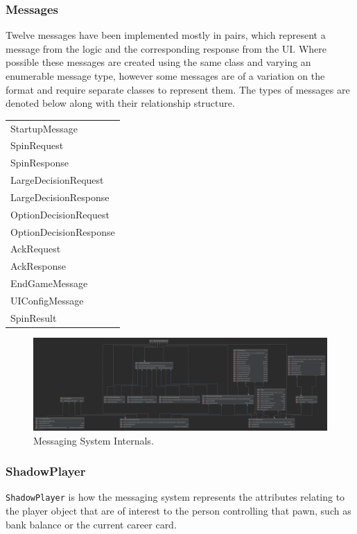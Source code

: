 \documentclass[a4paper, 11pt]{article}
\begin{document}
	\subsubsection*{Messages}
	Twelve messages have been implemented mostly in pairs, which represent a message from the logic and the corresponding response from the UI. Where possible these messages are created using the same class and varying an enumerable message type, however some messages are of a variation on the format and require separate classes to represent them. The types of messages are denoted below along with their relationship structure.
	\begin{table}[!ht]
		\begin{flushleft} 
			\begin{tabular}{l} 
				StartupMessage\\
				SpinRequest\\
				SpinResponse\\
				LargeDecisionRequest\\
				LargeDecisionResponse\\
				OptionDecisionRequest\\
				OptionDecisionResponse\\
				AckRequest\\
				AckResponse\\
				EndGameMessage\\
				UIConfigMessage\\
				SpinResult\\	
			\end{tabular}
		\end{flushleft}
	\end{table}
	\begin{figure}[H]
		\centering
		\includegraphics[scale=.125]{uml/messaging_internals_uml}
		\caption{Messaging System Internals.}
		\label{fig:messages_uml}
	\end{figure}
	\subsubsection*{ShadowPlayer}
	\texttt{ShadowPlayer} is how the messaging system represents the attributes relating to the player object that are of interest to the person controlling that pawn, such as bank balance or the current career card.
	
\end{document}
